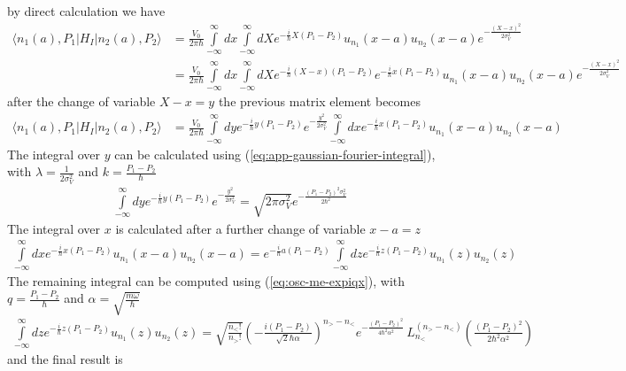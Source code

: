 by direct calculation we have
\begin{align}
  \langle n_1(a), P_1|H_I|n_2(a),P_2\rangle & = \frac{V_0}{2\pi\hbar}\int \limits_{-\infty}^{\infty} dx\int \limits_{-\infty}^{\infty} dX e^{-\frac{i}{\hbar}X(P_1-P_2)}u_{n_1}(x-a)u_{n_2}(x-a)e^{-\frac{(X-x)^2}{2\sigma_V^2}}\nonumber                         \\
  & =\frac{V_0}{2\pi\hbar}\int \limits_{-\infty}^{\infty} dx\int \limits_{-\infty}^{\infty} dX e^{-\frac{i}{\hbar}(X-x)(P_1-P_2)}e^{-\frac{i}{\hbar}x(P_1-P_2)}u_{n_1}(x-a)u_{n_2}(x-a)e^{-\frac{(X-x)^2}{2\sigma_V^2}}
\end{align}
after the change of variable $X-x=y$ the previous matrix element becomes
\begin{align}
  \langle n_1(a), P_1|H_I|n_2(a),P_2\rangle & = \frac{V_0}{2\pi\hbar}\int \limits_{-\infty}^{\infty} dy e^{-\frac{i}{\hbar}y(P_1-P_2)}e^{-\frac{y^2}{2\sigma_V^2}}\int \limits_{-\infty}^{\infty} dx e^{-\frac{i}{\hbar}x(P_1-P_2)}u_{n_1}(x-a)u_{n_2}(x-a)
\end{align}
The integral over $y$ can be calculated using (\ref{eq:app-gaussian-fourier-integral}), with $\lambda = \frac1{2\sigma_V^2}$ and $k = \frac{P_1-P_2}{\hbar}$
\begin{align}
  \int \limits_{-\infty}^{\infty} dy e^{-\frac{i}{\hbar}y(P_1-P_2)}e^{-\frac{y^2}{2\sigma_V^2}} = \sqrt{{2\pi\sigma_V^2}} e^{-\frac{(P_1-P_2)^2\sigma_V^2}{2\hbar^2}}
\end{align}
The integral over $x$ is calculated after a further change of variable $x-a=z$
\begin{align}
  \int \limits_{-\infty}^{\infty} dx e^{-\frac{i}{\hbar}x(P_1-P_2)}u_{n_1}(x-a)u_{n_2}(x-a) = e^{-\frac{i}{\hbar}a(P_1-P_2)}\int \limits_{-\infty}^{\infty} dz e^{-\frac{i}{\hbar}z(P_1-P_2)}u_{n_1}(z)u_{n_2}(z)
\end{align}
The remaining integral can be computed using (\ref{eq:osc-me-expiqx}), with $q = \frac{P_1-P_2}{\hbar}$ and $\alpha = \sqrt{\frac{m\omega}{\hbar}}$
\begin{align}
  \int \limits_{-\infty}^{\infty} dz e^{-\frac{i}{\hbar}z(P_1-P_2)}u_{n_1}(z)u_{n_2}(z) = \sqrt{\frac{n_<!}{n_>!}} \left(-\frac{i (P_1-P_2)  }{\sqrt{2}\hbar\alpha}\right)^{n_> - n_<} e^{-\frac{(P_1-P_2)^2 }{4\hbar^2\alpha^2}} \, L_{n_<}^{(n_> - n_<)}\!\left(\frac{(P_1-P_2)^2 }{2\hbar^2\alpha^2}\right)
\end{align}
and the final result is
